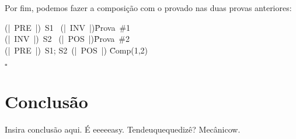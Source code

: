 \documentclass[12pt]{article}
\begin{document}
Por fim, podemos fazer a composição com o provado nas duas provas anteriores:
\begin{proofbox}
  \:(|\ PRE\ |)\ S1 \ (|\ INV\ |)\= Prova\ \#1 \\
  \:(|\ INV\ |)\ S2 \ (|\ POS\ |)\= Prova\ \#2 \\
  \:(|\ PRE\ |)\ S1; S2\ (|\ POS\ |) \= Comp(1,2)  \\
\end{proofbox}
\hfill $\square$

\section{Conclusão}
\paragraph{}
Insira conclusão aqui.
É eeeeeasy. Tendeuquequedizê? Mecânicow.



\end{document}
